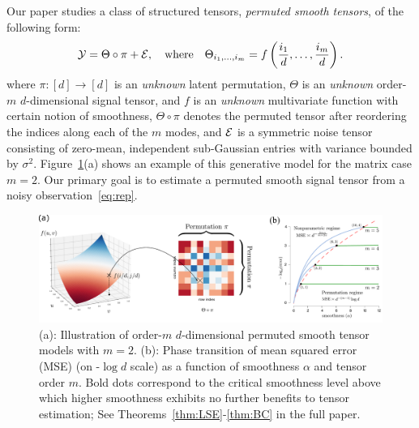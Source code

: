 \documentclass[11pt]{article}
\theoremstyle{definition}
\begin{document}


Our paper studies a class of structured tensors, \emph{permuted smooth tensors}, of the following form:
\begin{equation}\label{eq:rep}
\mathcal{Y}=\Theta\circ \pi+\mathcal{E},\quad\text{where}\quad \Theta_{i_1,\ldots,i_m} = f\left({i_1\over d},\ldots,{i_m\over d}\right).
\end{equation}
where $\pi\colon[d]\rightarrow[d]$ is an \emph{unknown} latent permutation, $\Theta$ is an \emph{unknown} order-$m$ $d$-dimensional signal tensor, and $f$ is an \emph{unknown} multivariate function with certain notion of smoothness, $\Theta \circ \pi $ denotes the permuted tensor after reordering the indices along each of the $m$ modes, and $\mathcal{E}$ is a symmetric noise tensor consisting of zero-mean, independent sub-Gaussian entries with variance bounded by $\sigma^2$. Figure~\ref{fig:rate}(a) shows an example of this generative model for the matrix case $m=2$.  Our primary goal is to estimate a permuted smooth signal tensor from a noisy observation~\eqref{eq:rep}.  

\begin{figure}[h]
    \centering
    \includegraphics[width = .75\textwidth]{figure/semantic_new.pdf}
    \caption{\small(a): Illustration of order-$m$ $d$-dimensional permuted smooth tensor models with $m=2$. (b): Phase transition of mean squared error (MSE) (on -$\log d$ scale) as a function of smoothness
$\alpha$ and tensor order $m$. Bold dots correspond to the critical smoothness level above which higher
smoothness exhibits no further benefits to tensor estimation; See Theorems~\ref{thm:LSE}-\ref{thm:BC} in the full paper.} \label{fig:rate}
\end{figure}
\end{document}

